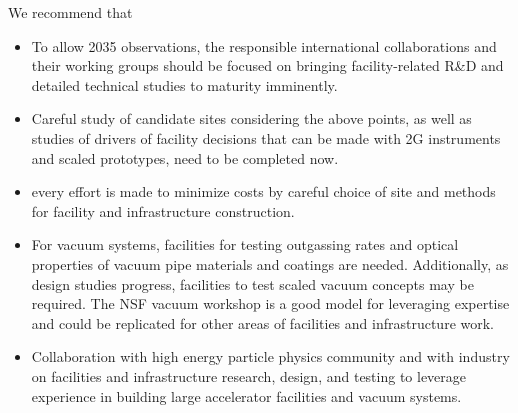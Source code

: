 We recommend that
\begin{itemize}
\item To allow 2035 observations, the responsible international collaborations and their working groups should be focused on bringing facility-related R\&D and detailed technical studies to maturity imminently.
\item Careful study of candidate sites considering the above points, as well as studies of drivers of facility decisions that can be made with 2G instruments and scaled prototypes, need to be completed now. 
\item  every effort  is made to minimize costs by careful choice of site and methods for facility and infrastructure construction.
\item For vacuum systems, facilities for testing outgassing rates and optical properties of vacuum pipe materials and coatings are needed. Additionally, as design studies progress, facilities to test scaled vacuum concepts may be required.
The NSF vacuum workshop is a good model for leveraging expertise and could be replicated for other areas of facilities and infrastructure work.
\item Collaboration with high energy particle physics community and with industry on facilities and infrastructure research, design, and testing  to leverage experience in building large accelerator facilities and vacuum systems.
\end{itemize}



